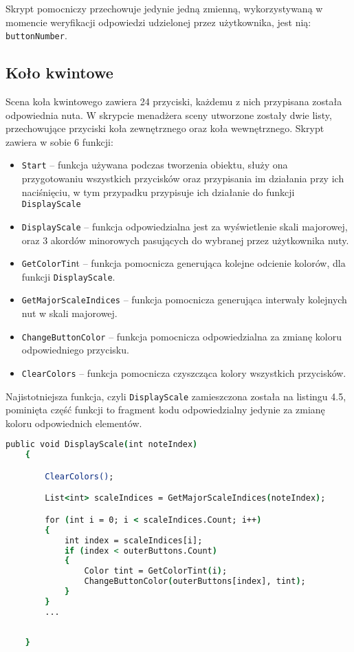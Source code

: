 Skrypt pomocniczy przechowuje jedynie jedną zmienną, wykorzystywaną w momencie weryfikacji odpowiedzi udzielonej przez użytkownika, jest nią: \texttt{buttonNumber}.

\subsection{Koło kwintowe}

Scena koła kwintowego zawiera 24 przyciski, każdemu z nich przypisana została odpowiednia nuta. W skrypcie menadżera sceny utworzone zostały dwie listy, przechowujące przyciski koła zewnętrznego oraz koła wewnętrznego. Skrypt zawiera w sobie 6 funkcji:

\begin{itemize}
\item \texttt{Start} -- funkcja używana podczas tworzenia obiektu, służy ona przygotowaniu wszystkich przycisków oraz przypisania im działania przy ich naciśnięciu, w tym przypadku przypisuje ich działanie do funkcji \texttt{DisplayScale}
\item \texttt{DisplayScale} -- funkcja odpowiedzialna jest za wyświetlenie skali majorowej, oraz 3 akordów minorowych pasujących do wybranej przez użytkownika nuty. 
\item \texttt{GetColorTin}t -- funkcja pomocnicza generująca kolejne odcienie kolorów, dla funkcji \texttt{DisplayScale}.
\item \texttt{GetMajorScaleIndices} -- funkcja pomocnicza generująca interwały kolejnych nut w skali majorowej.
\item \texttt{ChangeButtonColor} -- funkcja pomocnicza odpowiedzialna za zmianę koloru odpowiedniego przycisku.
\item \texttt{ClearColors} -- funkcja pomocnicza czyszcząca kolory wszystkich przycisków.
\end{itemize}

Najistotniejsza funkcja, czyli \texttt{DisplayScale} zamieszczona została na listingu 4.5, pominięta część funkcji to fragment kodu odpowiedzialny jedynie za zmianę koloru odpowiednich elementów.

\begin{lstlisting}[language=csh,caption=Funkcja \texttt{DisplayScale}, label=lst:5]
    public void DisplayScale(int noteIndex)
    {

        ClearColors();

        List<int> scaleIndices = GetMajorScaleIndices(noteIndex);

        for (int i = 0; i < scaleIndices.Count; i++)
        {
            int index = scaleIndices[i];
            if (index < outerButtons.Count)
            {
                Color tint = GetColorTint(i);
                ChangeButtonColor(outerButtons[index], tint);
            }
        }
        ...
            
        
    }
\end{lstlisting}
